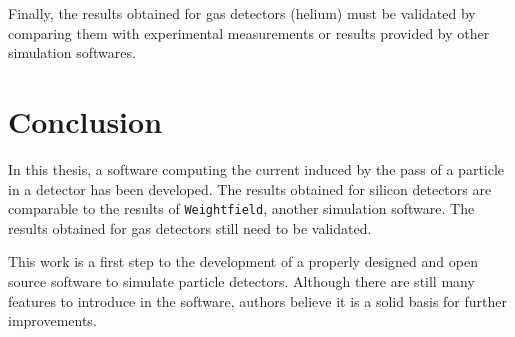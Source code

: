 \documentclass[11pt]{article}
\begin{document}
	Finally, the results obtained for gas detectors (helium) must be validated
	by comparing them with experimental measurements or results provided by other
	simulation softwares.

\section*{Conclusion}

	In this thesis, a software computing the current induced by the pass of a
	particle in a detector has been developed. The results obtained for silicon
	detectors are comparable to the results of \texttt{Weightfield},
	another simulation software. The results obtained for gas detectors still
	need to be validated.

	This work is a first step to the development of a properly designed and open source
	software to simulate particle detectors. Although there are still
	many features to introduce in the software, authors believe it is a solid
	basis for further improvements.

\newpage



\end{document}
